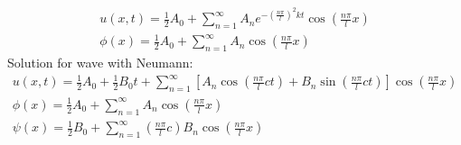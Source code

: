 \documentclass[12pt, a4paper]{article}
\begin{document}
\begin{gather*}
    u(x, t) =  \frac{1}{2}A_0 + \sum_{n=1}^{\infty} A_ne^{-\left(\frac{n\pi}{l}\right)^2 kt}\cos{\left(\frac{n\pi}{l}x\right)}\\
    \phi(x)= \frac{1}{2}A_0 + \sum_{n=1}^{\infty} A_n\cos{\left(\frac{n\pi}{l}x\right)}
\end{gather*}
Solution for wave with Neumann:
\begin{gather*}
    u(x, t) = \frac{1}{2}A_0 + \frac{1}{2}B_0t+\sum_{n=1}^{\infty} \left[A_n\cos{\left(\frac{n\pi}{l}ct\right)} + B_n\sin{\left(\frac{n\pi}{l}ct\right)}\right]\cos{\left(\frac{n\pi}{l}x\right)}\\
    \phi(x) = \frac{1}{2}A_0 +\sum_{n=1}^{\infty} A_n\cos{\left(\frac{n\pi}{l}x\right)}\\
    \psi(x) = \frac{1}{2}B_0 +\sum_{n=1}^{\infty} \left(\frac{n\pi}{l}c\right)B_n\cos{\left(\frac{n\pi}{l}x\right)}
\end{gather*}
\vspace{0.3em}
\end{document}

